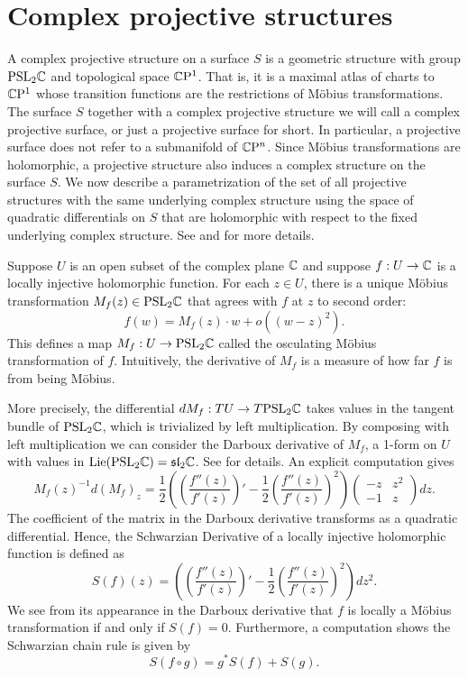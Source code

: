 \section{Complex projective structures}


A complex projective structure on a surface $S$ is a geometric structure with group $\mathrm{PSL}_2 \mathbb{C}$ and topological space $\mathbb{C}\mathrm{P}^1$.
That is, it is a maximal atlas of charts to $\mathbb{C}\mathrm{P}^1$ whose transition functions are the restrictions of M\"obius transformations.
The surface $S$ together with a complex projective structure we will call a complex projective surface, or just a projective surface for short. 
In particular, a projective surface does not refer to a submanifold of $\mathbb{C}\mathrm{P}^n$.
Since M\"obius transformations are holomorphic, a projective structure also induces a complex structure on the surface $S$.
We now describe a parametrization of the set of all projective structures with the same underlying complex structure using the space of quadratic differentials on $S$ that are holomorphic with respect to the fixed underlying complex structure. 
See \cite{thurston1986} and \cite{dumas2009} for more details.


Suppose $U$ is an open subset of the complex plane $\mathbb{C}$ and suppose $f: U \to \mathbb{C}$ is a locally injective holomorphic function.
For each $z \in U$, there is a unique M\"obius transformation $M_f(z) \in \mathrm{PSL}_2\mathbb{C}$ that agrees with $f$ at $z$ to second order:
\[
f(w) = M_f(z) \cdot w + o( (w-z)^2).
\]
This defines a map $M_f: U \to \mathrm{PSL}_2\mathbb{C}$ called the osculating M\"obius transformation of $f$.
Intuitively, the derivative of $M_f$ is a measure of how far $f$ is from being M\"obius.

More precisely, the differential $d M_f: TU \to T \mathrm{PSL}_2\mathbb{C}$ takes values in the tangent bundle of $\mathrm{PSL}_2\mathbb{C}$, which is trivialized by left multiplication. 
By composing with left multiplication we can consider the Darboux derivative of $M_f$, a 1-form on $U$ with values in $\mathrm{Lie}(\mathrm{PSL}_2\mathbb{C}) = \mathfrak{sl}_2 \mathbb{C}$. See \cite{sharpe1997} for details.
An explicit computation gives
\[
M_f(z)^{-1} d(M_f)_z = \frac{1}{2} \left( \left( \frac{f''(z)}{f'(z)} \right)' - \frac{1}{2} \left( \frac{f''(z)}{f'(z)} \right)^2 \right)
\begin{pmatrix}
-z & z^2 \\
-1 & z 
\end{pmatrix}
dz.
\]
The coefficient of the matrix in the Darboux derivative transforms as a quadratic differential. 
Hence, the Schwarzian Derivative of a locally injective holomorphic function is defined as 
\[
S(f)(z) = \left( \left( \frac{f''(z)}{f'(z)} \right)' - \frac{1}{2} \left( \frac{f''(z)}{f'(z)} \right)^2 \right) dz^2.
\]
We see from its appearance in the Darboux derivative that $f$ is locally a M\"obius transformation if and only if $S(f) = 0$.
Furthermore, a computation shows the Schwarzian chain rule is given by
\[
S(f \circ g) = g^* S(f) + S(g).
\]


